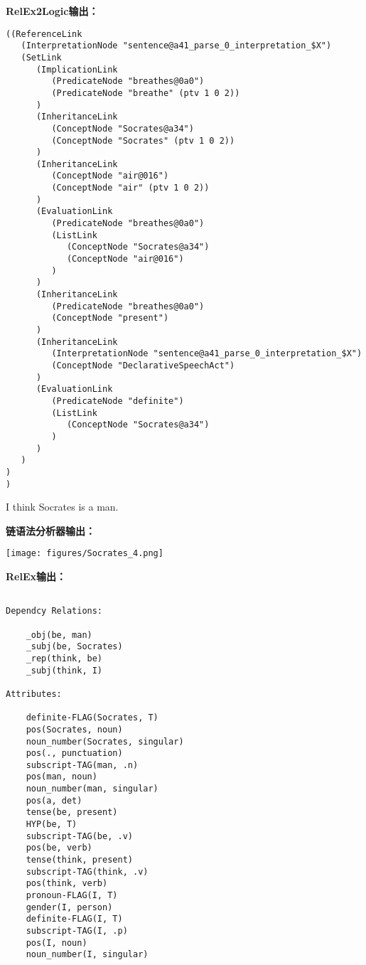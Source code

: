 {\bf RelEx2Logic输出：}

{\tt\begin{small}\begin{lstlisting}
((ReferenceLink
   (InterpretationNode "sentence@a41_parse_0_interpretation_$X")
   (SetLink
      (ImplicationLink
         (PredicateNode "breathes@0a0")
         (PredicateNode "breathe" (ptv 1 0 2))
      )
      (InheritanceLink
         (ConceptNode "Socrates@a34")
         (ConceptNode "Socrates" (ptv 1 0 2))
      )
      (InheritanceLink
         (ConceptNode "air@016")
         (ConceptNode "air" (ptv 1 0 2))
      )
      (EvaluationLink
         (PredicateNode "breathes@0a0")
         (ListLink
            (ConceptNode "Socrates@a34")
            (ConceptNode "air@016")
         )
      )
      (InheritanceLink
         (PredicateNode "breathes@0a0")
         (ConceptNode "present")
      )
      (InheritanceLink
         (InterpretationNode "sentence@a41_parse_0_interpretation_$X")
         (ConceptNode "DeclarativeSpeechAct")
      )
      (EvaluationLink
         (PredicateNode "definite")
         (ListLink
            (ConceptNode "Socrates@a34")
         )
      )
   )
)
)
\end{lstlisting}\end{small}}

  I think Socrates is a man.

{\bf 链语法分析器输出：}

\texttt{[image: figures/Socrates\_4.png]}

{\bf RelEx输出：}

\begin{verbatim}

Dependcy Relations:

    _obj(be, man)
    _subj(be, Socrates)
    _rep(think, be)
    _subj(think, I)

Attributes:

    definite-FLAG(Socrates, T)
    pos(Socrates, noun)
    noun_number(Socrates, singular)
    pos(., punctuation)
    subscript-TAG(man, .n)
    pos(man, noun)
    noun_number(man, singular)
    pos(a, det)
    tense(be, present)
    HYP(be, T)
    subscript-TAG(be, .v)
    pos(be, verb)
    tense(think, present)
    subscript-TAG(think, .v)
    pos(think, verb)
    pronoun-FLAG(I, T)
    gender(I, person)
    definite-FLAG(I, T)
    subscript-TAG(I, .p)
    pos(I, noun)
    noun_number(I, singular)

\end{verbatim}

